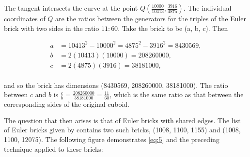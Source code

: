 \documentclass[11pt]{article}
\begin{document}
The tangent intersects the curve at the point $Q(\frac{10000}{10413}, \frac{3916}{4875})$. The individual coordinates of $Q$ are the ratios between the generators for the triples of the Euler brick with two sides in the ratio $11:60$. Take the brick to be (a, b, c). Then

\begin{equation*}
\begin{aligned}
a&=10413^2-10000^2=4875^2-3916^2=8430569, \\
b&=2(10413)(10000)=208260000, \\
c&=2(4875)(3916)=38181000, \\
\end{aligned}
\end{equation*}

and so the brick has dimensions (8430569, 208260000, 38181000). The ratio between $c$ and $b$ is $\frac{c}{b}=\frac{208260000}{38181000}=\frac{11}{60}$, which is the same ratio as that between the corresponding sides of the original cuboid.

The question that then arises is that of Euler bricks with shared edges. The list of Euler bricks given by \cite{bricklist} contains two such bricks, (1008, 1100, 1155) and (1008, 1100, 12075). The following figure demonstrates \eqref{eq:5} and the preceding technique applied to these bricks:
\end{document}

